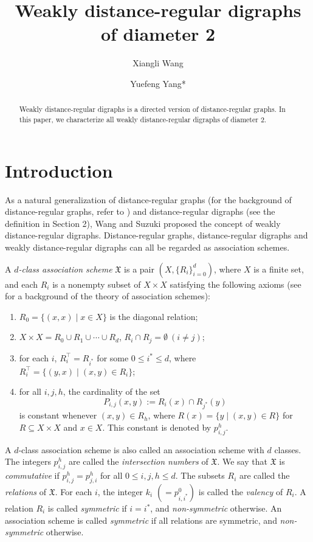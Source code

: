 \documentclass[12pt,a4paper]{amsart}
\title[Weakly distance-regular digraphs of diameter 2]{Weakly distance-regular digraphs of diameter 2}
\date{}
\author[Wang]{Xiangli Wang}
\author[Yang]{Yuefeng Yang*}
\theoremstyle{definition}
\begin{document}
	
\begin{abstract}
Weakly distance-regular digraphs is a directed version of distance-regular graphs. In this paper, we characterize all weakly distance-regular digraphs of diameter $2$.
\end{abstract}
	
	
	
\maketitle
\section{Introduction}
As a natural generalization of distance-regular graphs (for the background of distance-regular graphs, refer to \cite{AEB98,DKT16}) and distance-regular digraphs (see the definition in Section 2), Wang and Suzuki \cite{KSW03} proposed the concept of weakly distance-regular digraphs. Distance-regular graphs, distance-regular digraphs and weakly distance-regular digraphs can all be regarded as association schemes.

A \emph{$d$-class association scheme} $\mathfrak{X}$ is a pair $(X,\{R_{i}\}_{i=0}^{d})$, where $X$ is a finite set, and each $R_{i}$ is a
nonempty subset of $X\times X$ satisfying the following axioms (see \cite{EB21,EB84,PHZ96,PHZ05} for a background of the theory of association schemes):
\begin{enumerate}
\item \label{1} $R_{0}=\{(x,x)\mid x\in X\}$ is the diagonal relation;
	
\item \label{2} $X\times X=R_{0}\cup R_{1}\cup\cdots\cup R_{d}$, $R_{i}\cap R_{j}=\emptyset~(i\neq j)$;
	
\item \label{3} for each $i$, $R_{i}^{\top}=R_{i^{*}}$ for some $0\leq i^{*}\leq d$, where $R_{i}^{\top}=\{(y,x)\mid(x,y)\in R_{i}\}$;
	
\item \label{4} for all $i,j,h$, the cardinality of the set $$P_{i,j}(x,y):=R_{i}(x)\cap R_{j^{*}}(y)$$ is constant whenever $(x,y)\in R_{h}$, where $R(x)=\{y\mid (x,y)\in R\}$ for $R\subseteq X\times X$ and $x\in X$. This constant is denoted by $p_{i,j}^{h}$.
\end{enumerate}
A $d$-class association scheme is also called an association scheme with $d$ classes. The integers $p_{i,j}^{h}$ are called the \emph{intersection numbers} of $\mathfrak{X}$. We say that $\mathfrak{X}$ is \emph{commutative} if $p_{i,j}^{h}=p_{j,i}^{h}$ for all $0\leq i,j,h\leq d$. The subsets $R_{i}$ are called the \emph{relations} of $\mathfrak{X}$. For each $i$, the integer $k_{i}$ $(=p_{i,i^{*}}^{0})$ is called the \emph{valency} of $R_{i}$. A relation $R_{i}$ is called \emph{symmetric} if $i=i^{*}$, and \emph{non-symmetric} otherwise. An association scheme is called \emph{symmetric} if all relations are symmetric, and \emph{non-symmetric} otherwise.
\end{document}
